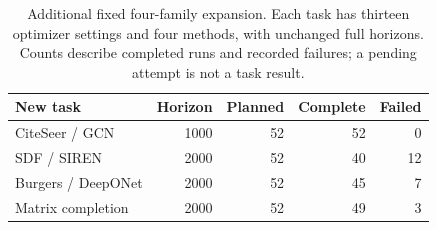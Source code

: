 \begin{table}[t]
\centering\small
\caption{Additional fixed four-family expansion. Each task has thirteen optimizer settings and four methods, with unchanged full horizons. Counts describe completed runs and recorded failures; a pending attempt is not a task result.}
\label{tab:new-task-status}
\begin{tabular}{lrrrr}
\toprule New task & Horizon & Planned & Complete & Failed\\\midrule
CiteSeer / GCN & 1000 & 52 & 52 & 0\\
SDF / SIREN & 2000 & 52 & 40 & 12\\
Burgers / DeepONet & 2000 & 52 & 45 & 7\\
Matrix completion & 2000 & 52 & 49 & 3\\
\bottomrule
\end{tabular}
\end{table}
